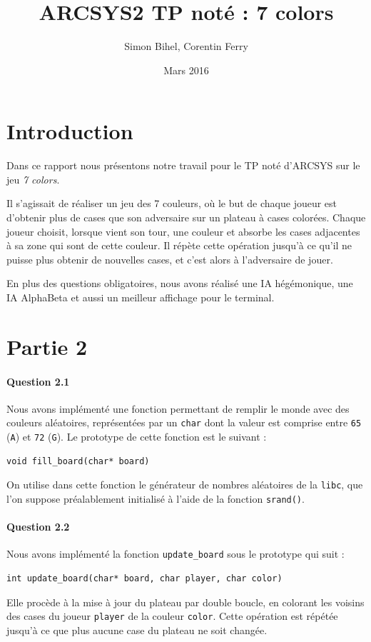 \documentclass[a4paper]{article}
\title{ARCSYS2 TP noté : 7 colors}
\author{Simon Bihel, Corentin Ferry}
\date{Mars 2016}
\begin{document}
    \maketitle

    \section{Introduction}
    Dans ce rapport nous présentons notre travail pour le TP noté d'ARCSYS sur 
    le jeu \emph{7 colors}. 
    
    Il s'agissait de réaliser un jeu des 7 couleurs, où le but de chaque joueur 
est d'obtenir plus de cases que son adversaire sur un plateau à cases colorées.
Chaque joueur choisit, lorsque vient son tour, une couleur et absorbe les cases 
adjacentes à sa zone qui sont de cette couleur. Il répète cette opération 
jusqu'à ce qu'il ne puisse plus obtenir de nouvelles cases, et c'est alors à 
l'adversaire de jouer.
    
    En plus des questions obligatoires, nous avons réalisé une IA hégémonique, 
une IA AlphaBeta et aussi un meilleur affichage pour le terminal.

    \section{Partie 2}
    \paragraph{Question 2.1}
    Nous avons implémenté une fonction permettant de remplir le monde avec
des couleurs aléatoires, représentées par un \texttt{char} dont la valeur est
comprise entre \texttt{65} (\texttt{A}) et \texttt{72} (\texttt{G}).
Le prototype de cette fonction est le suivant :
\begin{lstlisting}
void fill_board(char* board)
\end{lstlisting}
On utilise dans cette fonction le générateur de nombres aléatoires de la
\texttt{libc}, que l'on suppose préalablement initialisé à l'aide de la
fonction \texttt{srand()}.

    \paragraph{Question 2.2}

    Nous avons implémenté la fonction \texttt{update\_board} sous le prototype 
qui suit :
\begin{lstlisting}
int update_board(char* board, char player, char color)
\end{lstlisting}
Elle procède à la mise à jour du plateau par double boucle, en colorant les 
voisins des cases du joueur \texttt{player} de la couleur \texttt{color}.
Cette opération est répétée jusqu'à ce que plus aucune case du plateau ne soit 
changée.
\end{document}
